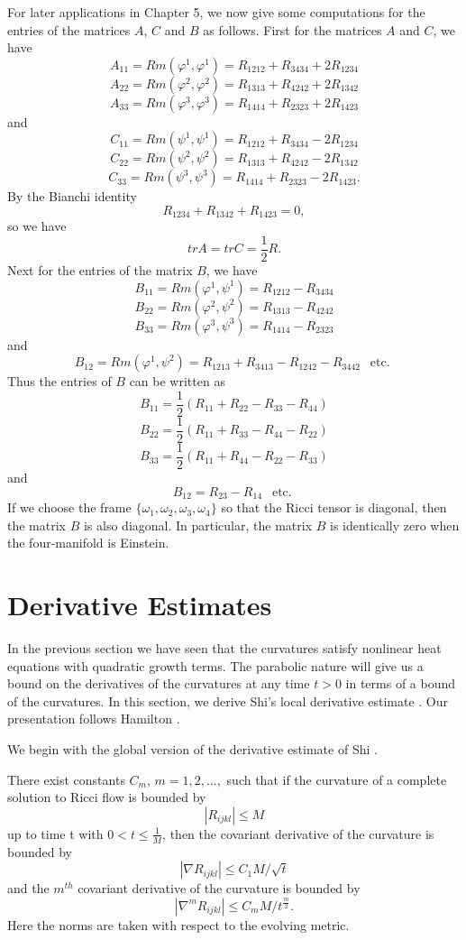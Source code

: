 For later applications in Chapter 5, we now give some computations
for the entries of the matrices $A$, $C$ and $B$ as follows. First
for the matrices $A$ and $C$, we have
$$
A_{11} = Rm(\varphi^1,\varphi^1) = R_{1212} + R_{3434} + 2R_{1234}
$$
$$
A_{22} = Rm(\varphi^2,\varphi^2) = R_{1313} + R_{4242} + 2R_{1342}
$$
$$
A_{33} = Rm(\varphi^3,\varphi^3) = R_{1414} + R_{2323} + 2R_{1423}
$$
and
$$
C_{11} = Rm(\psi^1,\psi^1) = R_{1212} + R_{3434} -2R_{1234}
$$
$$
C_{22} = Rm(\psi^2,\psi^2) = R_{1313} + R_{4242} -2R_{1342}
$$
$$
C_{33} = Rm(\psi^3,\psi^3) = R_{1414} + R_{2323} -2R_{1423}.
$$
By the Bianchi identity
$$
R_{1234} + R_{1342} + R_{1423} =0,
$$
so we have
$$
trA = trC = \frac{1}{2}R.
$$
Next for the entries of the matrix $B$, we have
$$
B_{11} = Rm(\varphi^1,\psi^1) = R_{1212} - R_{3434}
$$
$$
B_{22} = Rm(\varphi^2,\psi^2) = R_{1313} - R_{4242}
$$
$$
B_{33} = Rm(\varphi^3,\psi^3) = R_{1414} - R_{2323}
$$
and
$$
B_{12} = Rm(\varphi^1,\psi^2) = R_{1213} + R_{3413} -R_{1242} -
R_{3442} \ \ \mbox{ etc. }
$$
Thus the entries of $B$ can be written as
$$
B_{11} = \frac{1}{2}(R_{11} + R_{22} -R_{33} -R_{44})
$$
$$
B_{22} = \frac{1}{2}(R_{11} + R_{33} -R_{44} -R_{22})
$$
$$
B_{33} = \frac{1}{2}(R_{11} + R_{44} -R_{22} -R_{33})
$$
and
$$
B_{12} = R_{23} - R_{14} \ \ \mbox{ etc. }
$$
If we choose the frame $\{ \omega_1, \omega_2, \omega_3, \omega_4
\}$ so that the Ricci tensor is diagonal, then the matrix $B$ is
also diagonal. In particular, the matrix $B$ is identically zero
when the four-manifold is Einstein.


\section{Derivative Estimates}

In the previous section we have seen that the curvatures satisfy
nonlinear heat equations with quadratic growth terms. The
parabolic nature will give us a bound on the derivatives of the
curvatures at any time $t>0$ in terms of a bound of the
curvatures. In this section, we derive Shi's local derivative
estimate \cite{Sh89}. Our presentation follows Hamilton
\cite{Ha95F}.

We begin with the global version of the derivative estimate of Shi
\cite{Sh89}.

\begin{theorem}
  \label{thm:cz-global-curvature-derivative-estimates}
There exist constants $C_m$, $m=1,2,\ldots,$ such that if the
curvature of a complete solution to Ricci flow is bounded by
$$
|R_{ijkl}|\leq M
$$
up to time t with $0<t\leq \frac{1}{M}$, then the covariant
derivative of the curvature is bounded by
$$
|\nabla R_{ijkl}|\leq C_1M/\sqrt{t}
$$
and the $m^{th}$ covariant derivative of the curvature is bounded
by
$$
|\nabla^mR_{ijkl}|\leq C_mM/t^{\frac{m}{2}}.
$$
Here the norms are taken with respect to the evolving metric.
\end{theorem}

